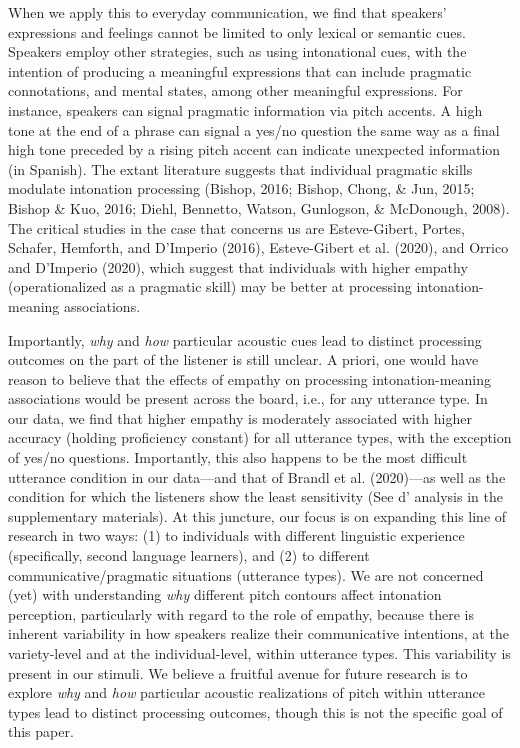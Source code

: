\documentclass[]{article}
\begin{document}
When we apply this to everyday communication, we find that speakers' expressions and feelings cannot be limited to only lexical or semantic cues.
Speakers employ other strategies, such as using intonational cues, with the intention of producing a meaningful expressions that can include pragmatic connotations, and mental states, among other meaningful expressions.
For instance, speakers can signal pragmatic information via pitch accents.
A high tone at the end of a phrase can signal a yes/no question the same way as a final high tone preceded by a rising pitch accent can indicate unexpected information (in Spanish).
The extant literature suggests that individual pragmatic skills modulate intonation processing (Bishop, 2016; Bishop, Chong, \& Jun, 2015; Bishop \& Kuo, 2016; Diehl, Bennetto, Watson, Gunlogson, \& McDonough, 2008).
The critical studies in the case that concerns us are Esteve-Gibert, Portes, Schafer, Hemforth, and D'Imperio (2016), Esteve-Gibert et al. (2020), and Orrico and D'Imperio (2020), which suggest that individuals with higher empathy (operationalized as a pragmatic skill) may be better at processing intonation-meaning associations.

Importantly, \emph{why} and \emph{how} particular acoustic cues lead to distinct processing outcomes on the part of the listener is still unclear.
A priori, one would have reason to believe that the effects of empathy on processing intonation-meaning associations would be present across the board, i.e., for any utterance type.
In our data, we find that higher empathy is moderately associated with higher accuracy (holding proficiency constant) for all utterance types, with the exception of yes/no questions.
Importantly, this also happens to be the most difficult utterance condition in our data---and that of Brandl et al. (2020)---as well as the condition for which the listeners show the least sensitivity (See d' analysis in the supplementary materials).
At this juncture, our focus is on expanding this line of research in two ways: (1) to individuals with different linguistic experience (specifically, second language learners), and (2) to different communicative/pragmatic situations (utterance types).
We are not concerned (yet) with understanding \emph{why} different pitch contours affect intonation perception, particularly with regard to the role of empathy, because there is inherent variability in how speakers realize their communicative intentions, at the variety-level and at the individual-level, within utterance types.
This variability is present in our stimuli.
We believe a fruitful avenue for future research is to explore \emph{why} and \emph{how} particular acoustic realizations of pitch within utterance types lead to distinct processing outcomes, though this is not the specific goal of this paper.
\end{document}

